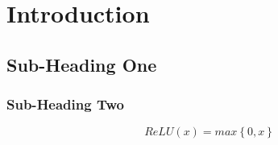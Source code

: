 \pagestyle{fancyArabic}
\section{Introduction}
\vspace{-3em}
\subsection{Sub-Heading One}
\label{sec:machine learning}
\vspace{-2em}
\hspace{\parindent} \blindtext \cite{nabli_curriculum_2020,daskalakis_independent_2021}

\vspace{-2em}
\subsubsection{Sub-Heading Two}
\label{sec:deep learning}
\vspace{-2em}
\hspace{\parindent} \blindtext

\vspace{-2em}
\begin{equation}\label{eq:relu}
    ReLU(x) = max\left\{0,x\right\}
\end{equation}